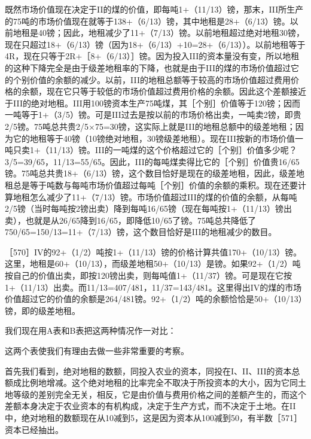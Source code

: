 既然市场价值现在决定于II的煤的价值，即每吨1+（11/13）镑，那末，III所生产的75吨的市场价值现在就等于138+（6/13）镑，其中地租是28+（6/13）镑。以前地租是40镑；因此，地租减少了11+（7/13）镑。以前地租超过绝对地租30镑，现在只超过18+（6/13）镑（因为18+（6/13）+10=28+（6/13））。以前地租等于4R，现在只等于2R+［8+（6/13）］镑。因为投入III的资本量没有变，所以地租的这种下降完全是由于级差地租率的下降，也就是由于III的煤的市场价值超过它的个别价值的余额的减少。以前，III的地租总额等于较高的市场价值超过费用价格的余额，现在它只等于较低的市场价值超过费用价格的余额。因此这个差额接近于III的绝对地租。III用100镑资本生产75吨煤，其［个别］价值等于120镑；因而一吨等于1+（3/5）镑。可是III过去是按以前的市场价格出卖，一吨卖2镑，即贵2/5镑。75吨总共贵2/5×75=30镑，这实际上就是III的地租总额中的级差地租；因为它的地租等于40镑（10镑绝对地租，30镑级差地租）。现在III按新的市场价值一吨只卖1+（11/13）镑。III的一吨煤的这个价格超过它的［个别］价值多少呢？3/5=39/65，11/13=55/65。因此，III的每吨煤卖得比它的［个别］价值贵16/65镑。75吨总共贵18+（6/13）镑，这个数目恰好是现在的级差地租，因此，级差地租总是等于吨数与每吨市场价值超过每吨［个别］价值的余额的乘积。现在还要计算地租怎么减少了11+（7/13）镑。市场价值超过III的煤的价值的余额，从每吨2/5镑（当时每吨按2镑出卖）降到每吨16/65镑（现在每吨按1+（11/13）镑出卖），也就是从26/65降到16/65，即降低10/65了镑。75吨总共降低了750/65=150/13=11+（7/13）镑，这个数目恰好是III的地租减少的数目。

［570］IV的92+（1/2）吨按1+（11/13）镑的价格计算共值170+（10/13）镑。这里，地租是60+（10/13），而级差地租50+（10/13）是镑。如果92+（1/2）吨按自己的价值出卖，即按120镑出卖，则每吨值1+（11/37）镑。可是现在它按1+（11/13）出卖。而11/13=407/481，11/37=143/481。这里得出IV的煤的市场价值超过它的价值的余额是264/481镑。92+（1/2）吨的余额恰恰是50+（10/13）镑，即的级差地租。

我们现在用A表和B表把这两种情况作一对比：

\todo{}

\todo{}

这两个表使我们有理由去做一些非常重要的考察。

首先我们看到，绝对地租的数额，同投入农业的资本，同投在I、II、III的资本总额成比例地增减。这个绝对地租的比率完全不取决于所投资本的大小，因为它同土地等级的差别完全无关，相反，它是由价值与费用价格之间的差额产生的，而这个差额本身决定于农业资本的有机构成，决定于生产方式，而不决定于土地。在II中，绝对地租的数额现在从10减到5，这是因为资本从100减到50，有半数［571］资本已经抽出。

